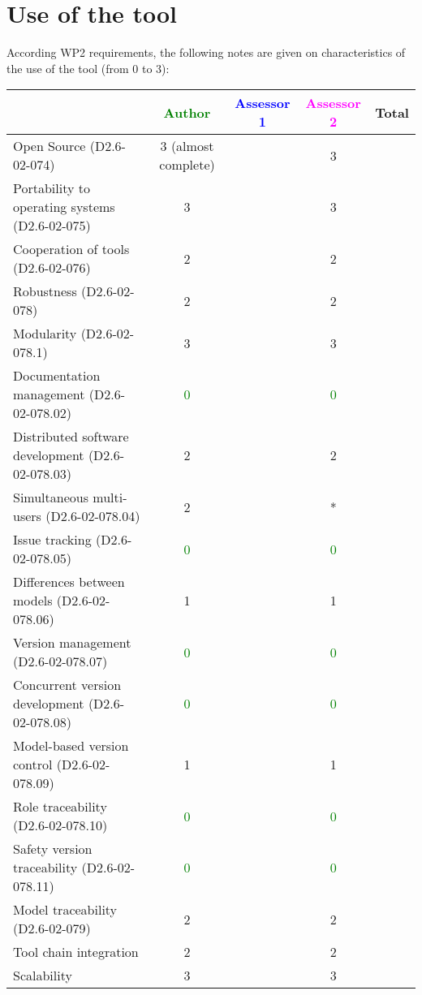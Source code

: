 \section{Use of the tool}


According WP2 requirements, the following notes are given on characteristics of the use of the tool (from 0 to 3):

\begin{tabular}{|l | c | c | c | c|}
\hline
& \textcolor{green}{Author} & \textcolor{blue}{Assessor 1} & \textcolor{magenta}{Assessor 2} & Total \\
\hline 
Open Source (D2.6-02-074) & 3    (almost complete)& & 3    &  \\
\hline 
Portability to operating systems (D2.6-02-075) & 3    & & 3    &  \\
\hline
Cooperation of tools (D2.6-02-076) & 2    & & 2    &  \\
\hline
Robustness (D2.6-02-078) & 2    & & 2    & \\
\hline
Modularity (D2.6-02-078.1) & 3    & & 3    & \\
\hline
Documentation management (D2.6-02-078.02) & \textcolor{green}{0} & & \textcolor{green}{0} & \\
\hline
Distributed software development (D2.6-02-078.03)  & 2    & & 2    & \\
\hline
Simultaneous multi-users (D2.6-02-078.04)   & 2    & & * & \\
\hline
Issue tracking (D2.6-02-078.05) & \textcolor{green}{0} & & \textcolor{green}{0} & \\
\hline
Differences between models (D2.6-02-078.06) & 1    & & 1    & \\
\hline
Version management (D2.6-02-078.07) & \textcolor{green}{0} & & \textcolor{green}{0} & \\
\hline
Concurrent version development (D2.6-02-078.08) & \textcolor{green}{0} & & \textcolor{green}{0} & \\
\hline
Model-based version control (D2.6-02-078.09) & 1    & & 1    & \\
\hline
Role traceability (D2.6-02-078.10) & \textcolor{green}{0} & & \textcolor{green}{0} & \\
\hline
Safety version traceability (D2.6-02-078.11) & \textcolor{green}{0} & & \textcolor{green}{0} & \\
\hline
Model traceability (D2.6-02-079) & 2    & & 2    & \\
\hline
Tool chain integration & 2    & & 2    & \\
\hline
Scalability & 3    & & 3    & \\
\hline
\end{tabular}

